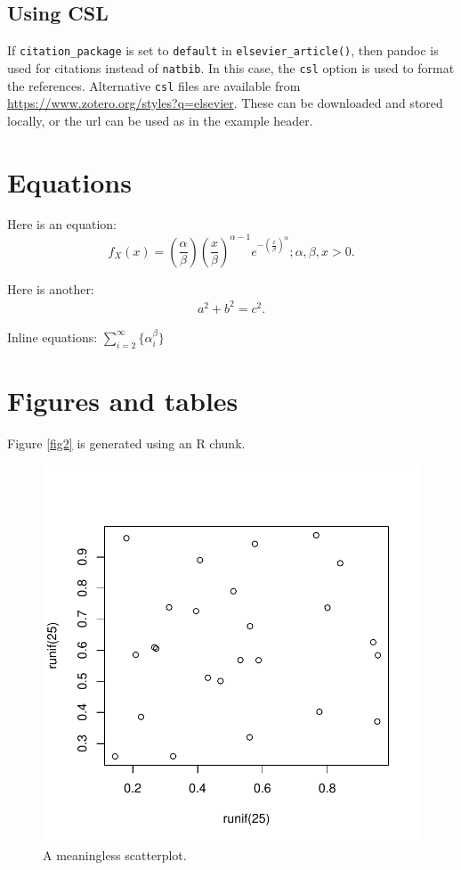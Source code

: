 \documentclass[
]{article}
\begin{document}
\subsection{Using CSL}\label{using-csl}

If \texttt{citation\_package} is set to \texttt{default} in
\texttt{elsevier\_article()}, then pandoc is used for citations instead
of \texttt{natbib}. In this case, the \texttt{csl} option is used to
format the references. Alternative \texttt{csl} files are available from
\url{https://www.zotero.org/styles?q=elsevier}. These can be downloaded
and stored locally, or the url can be used as in the example header.

\section{Equations}\label{equations}

Here is an equation: \[ 
  f_{X}(x) = \left(\frac{\alpha}{\beta}\right)
  \left(\frac{x}{\beta}\right)^{\alpha-1}
  e^{-\left(\frac{x}{\beta}\right)^{\alpha}}; 
  \alpha,\beta,x > 0 .
\]

Here is another: \begin{align}
  a^2+b^2=c^2.
\end{align}

Inline equations: \(\sum_{i = 2}^\infty\{\alpha_i^\beta\}\)

\section{Figures and tables}\label{figures-and-tables}

Figure \ref{fig2} is generated using an R chunk.

\begin{figure}

{\centering \includegraphics[width=0.5\linewidth]{ArtigoElsevier_files/figure-latex/fig2-1} 

}

\caption{\label{fig2}A meaningless scatterplot.}\label{fig:fig2}
\end{figure}
\end{document}
